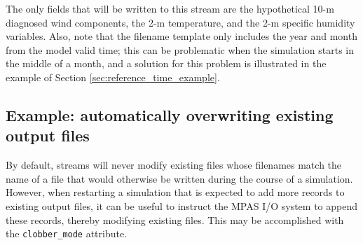 \vspace{12pt}
 \newline
\hspace*{\mutindent}{\tt type="output"} \newline
\hspace*{\mutindent}{\tt filename\_template="diagnostics.\$Y-\$M.nc"} \newline
\hspace*{\mutindent}{\tt filename\_interval="01-00\_00:00:00"} \newline
\hspace*{\mutindent}{\tt precision="single"} \newline
\hspace*{\mutindent}{\tt output\_interval="6:00:00" />} \newline
\newline
\hspace*{1cm}{\tt <var name="u10"/>} \newline
\hspace*{1cm}{\tt <var name="v10"/>} \newline
\hspace*{1cm}{\tt <var name="t2"/>} \newline
\hspace*{1cm}{\tt <var name="q2"/>} \newline
\newline
{} \newline
\vspace{12pt}

The only fields that will be written to this stream are the hypothetical 10-m diagnosed wind components, the 2-m temperature, 
and the 2-m specific humidity variables. Also, note that the filename template only includes the year and month from the model 
valid time; this can be problematic when the simulation starts in the middle of a month, and a solution for this problem 
is illustrated in the example of Section \ref{sec:reference_time_example}.

\subsection{Example: automatically overwriting existing output files}
\label{sec:overwrite_example}

By default, streams will never modify existing files whose filenames match the name of a file that would otherwise be written
during the course of a simulation. However, when restarting a simulation that is expected to add more records to existing output 
files, it can be useful to instruct the MPAS I/O system to append these records, thereby modifying existing files. This may be 
accomplished with the {\tt clobber\_mode} attribute.

